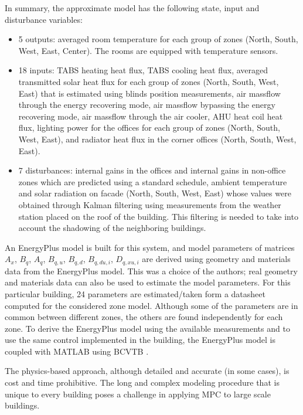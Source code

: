 	In summary, the approximate model has the following state, input and disturbance variables:
	\begin{itemize}
		\item 5 outputs: averaged room temperature for each group of zones (North, South, West, East, Center). The rooms are equipped with temperature sensors.
		\item 18 inputs: TABS heating heat flux, TABS cooling heat flux, averaged transmitted solar heat flux for each group of zones (North, South, West, East) that is estimated using blinds position measurements, air massflow through the energy recovering mode, air massflow bypassing the energy recovering mode, air massflow through the air cooler, AHU heat coil heat flux, lighting power for the offices for each group of zones (North, South, West, East), and radiator heat flux in the corner offices (North, South, West, East).
		\item 7 disturbances: internal gains in the offices and internal gains in non-office zones which are predicted using a standard schedule, ambient temperature and solar radiation on facade (North, South, West, East) whose values were obtained through Kalman filtering using measurements from the weather station placed on the roof of the building. This filtering is needed to take into account the shadowing of the neighboring buildings.
	\end{itemize}
An EnergyPlus model is built for this system, and model parameters of matrices $A_x$, $B_q$, $A_q$, $B_{q,u}$, $B_{q,d}$, $B_{q,du,i}$, $D_{q,xu,i}$ are derived using geometry and materials data from the EnergyPlus model.
This was a choice of the authors; real geometry and materials data can also be used to estimate the model parameters. 
For this particular building, 24 parameters are estimated/taken form a datasheet computed for the considered zone model.
Although some of the parameters are in common between different zones, the others are found independently for each zone.
To derive the EnergyPlus model using the available measurements and to use the same control implemented in the building, the EnergyPlus model is coupled with MATLAB using BCVTB \cite{Wetter2015}. 

The physics-based approach, although detailed and accurate (in some cases), is cost and time prohibitive. The long and complex modeling procedure that is unique to every building poses a challenge in applying MPC to large scale buildings.

